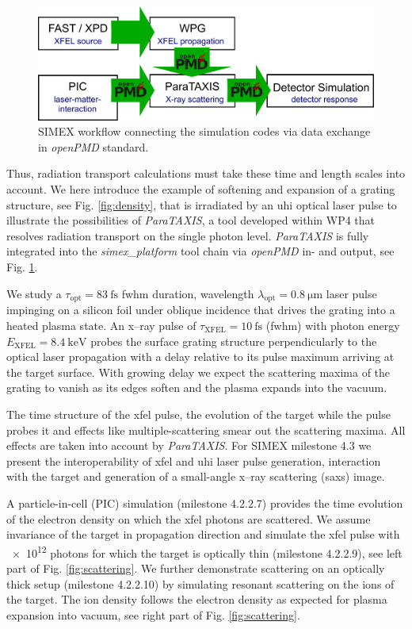 \begin{figure}
\centering
  \includegraphics[width=.85\linewidth]{figures/simex_workflow_v2.png}
\caption{
SIMEX workflow connecting the simulation codes via data exchange in \textit{openPMD} standard.
}
  \label{fig:workflows}
\end{figure}

Thus, radiation transport calculations must take these time and length scales
into account. We here introduce the example of softening and expansion of a
grating structure, see Fig. \ref{fig:density},  that is irradiated by an \gls{uhi}
optical laser pulse to illustrate the possibilities of \textit{ParaTAXIS}, a tool
developed within WP4 that resolves radiation transport on the single photon
level. \textit{ParaTAXIS} is fully integrated into the \textit{simex\_platform} tool chain via
\textit{openPMD} \cite{Huebl2017} in- and output, see Fig. \ref{fig:workflows}.

We study a $\tau_\mathrm{opt} = \SI{83}{\fs}$ \gls{fwhm} duration, wavelength $\lambda_\mathrm{opt} =
\SI{0.8}{\micro\metre}$ laser pulse impinging on a silicon foil under oblique incidence
that drives the grating into a heated plasma state. An x--ray pulse of
$\tau_\mathrm{XFEL} = \SI{10}{\fs}$ (\gls{fwhm}) with photon energy
$E_\mathrm{XFEL} = \SI{8.4}{\kilo\electronvolt}$ probes the surface grating structure
perpendicularly to the optical laser propagation with a delay relative to its
pulse maximum arriving at the target surface. With growing delay we expect the
scattering maxima of the grating to vanish as its edges soften and the plasma
expands into the vacuum.

The time structure of the \gls{xfel} pulse, the evolution of the target while the
pulse probes it and effects like multiple-scattering smear out the scattering
maxima. All effects are taken into account by \textit{ParaTAXIS}. For SIMEX milestone 4.3
we present the interoperability of \gls{xfel} and \gls{uhi} laser pulse generation,
interaction with the target and generation of a small-angle x--ray scattering
(\gls{saxs}) image.

A particle-in-cell (PIC) simulation (milestone 4.2.2.7) provides the time
evolution of the electron density on which the \gls{xfel} photons are scattered. We
assume invariance of the target in propagation direction and simulate the \gls{xfel}
pulse with \num{e12} photons for which the target is optically thin (milestone
4.2.2.9), see left part of Fig. \ref{fig:scattering}. We further demonstrate
scattering on an optically thick setup (milestone 4.2.2.10) by simulating
resonant scattering on the ions of the target. The ion density follows the
electron density as expected for plasma expansion into vacuum\cite{Mora2003},
see right part of Fig. \ref{fig:scattering}.

